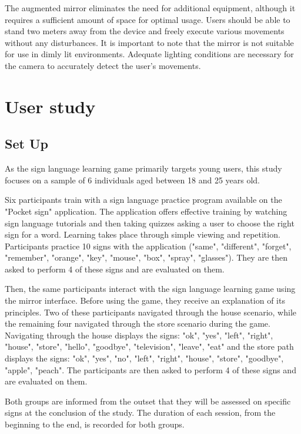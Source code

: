 The augmented mirror eliminates the need for additional equipment, although it requires a sufficient amount of space for optimal usage. Users should be able to stand two meters away from the device and freely execute various movements without any disturbances. It is important to note that the mirror is not suitable for use in dimly lit environments. Adequate lighting conditions are necessary for the camera to accurately detect the user's movements.

\section{User study}

\subsection{Set Up}

As the sign language learning game primarily targets young users, this study focuses on a sample of 6 individuals aged between 18 and 25 years old.

Six participants train with a sign language practice program available on the "Pocket sign" application. The application offers effective training by watching sign language tutorials and then taking quizzes asking a user to choose the right sign for a word. Learning takes place through simple viewing and repetition. Participants practice 10 signs with the application ("same", "different", "forget", "remember", "orange", "key", "mouse", "box", "spray", "glasses"). They are then asked to perform 4 of these signs and are evaluated on them.

Then, the same participants interact with the sign language learning game using the mirror interface. Before using the game, they receive an explanation of its principles. Two of these participants navigated through the house scenario, while the remaining four navigated through the store scenario during the game. Navigating through the house displays the signs: "ok", "yes", "left", "right", "house", "store", "hello", "goodbye", "television", "leave", "eat" and the store path displays the signs: "ok", "yes", "no", "left", "right", "house", "store", "goodbye", "apple", "peach". The participants are then asked to perform 4 of these signs and are evaluated on them.

Both groups are informed from the outset that they will be assessed on specific signs at the conclusion of the study. The duration of each session, from the beginning to the end, is recorded for both groups.

